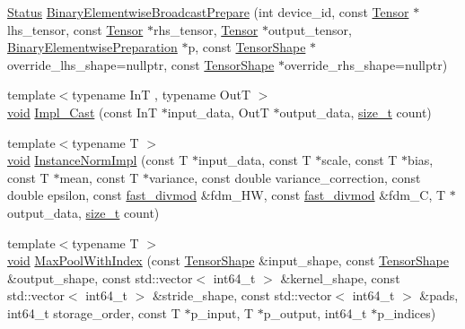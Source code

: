 \begin{DoxyCompactItemize}
\item 
\mbox{\hyperlink{classonnxruntime_1_1common_1_1Status}{Status}} \mbox{\hyperlink{namespaceonnxruntime_1_1cuda_abdb130419be4fca46b9b5a2f288e3f37}{Binary\+Elementwise\+Broadcast\+Prepare}} (int device\+\_\+id, const \mbox{\hyperlink{classonnxruntime_1_1Tensor}{Tensor}} $\ast$lhs\+\_\+tensor, const \mbox{\hyperlink{classonnxruntime_1_1Tensor}{Tensor}} $\ast$rhs\+\_\+tensor, \mbox{\hyperlink{classonnxruntime_1_1Tensor}{Tensor}} $\ast$output\+\_\+tensor, \mbox{\hyperlink{structonnxruntime_1_1cuda_1_1BinaryElementwisePreparation}{Binary\+Elementwise\+Preparation}} $\ast$p, const \mbox{\hyperlink{classonnxruntime_1_1TensorShape}{Tensor\+Shape}} $\ast$override\+\_\+lhs\+\_\+shape=nullptr, const \mbox{\hyperlink{classonnxruntime_1_1TensorShape}{Tensor\+Shape}} $\ast$override\+\_\+rhs\+\_\+shape=nullptr)
\item 
{\footnotesize template$<$typename InT , typename OutT $>$ }\\\mbox{\hyperlink{mlasi_8h_a88f941d423cb2a819b70a1358982b1a6}{void}} \mbox{\hyperlink{namespaceonnxruntime_1_1cuda_a5ec73c46b242d6ea59dd9965bc34e13f}{Impl\+\_\+\+Cast}} (const InT $\ast$input\+\_\+data, OutT $\ast$output\+\_\+data, \mbox{\hyperlink{mlasi_8h_a503efbc1c6e50825320ad909366b78ab}{size\+\_\+t}} count)
\item 
{\footnotesize template$<$typename T $>$ }\\\mbox{\hyperlink{mlasi_8h_a88f941d423cb2a819b70a1358982b1a6}{void}} \mbox{\hyperlink{namespaceonnxruntime_1_1cuda_af407fc77f1d77fc8f5a4a421d8545fbd}{Instance\+Norm\+Impl}} (const T $\ast$input\+\_\+data, const T $\ast$scale, const T $\ast$bias, const T $\ast$mean, const T $\ast$variance, const double variance\+\_\+correction, const double epsilon, const \mbox{\hyperlink{classonnxruntime_1_1cuda_1_1fast__divmod}{fast\+\_\+divmod}} \&fdm\+\_\+\+HW, const \mbox{\hyperlink{classonnxruntime_1_1cuda_1_1fast__divmod}{fast\+\_\+divmod}} \&fdm\+\_\+C, T $\ast$output\+\_\+data, \mbox{\hyperlink{mlasi_8h_a503efbc1c6e50825320ad909366b78ab}{size\+\_\+t}} count)
\item 
{\footnotesize template$<$typename T $>$ }\\\mbox{\hyperlink{mlasi_8h_a88f941d423cb2a819b70a1358982b1a6}{void}} \mbox{\hyperlink{namespaceonnxruntime_1_1cuda_af278cd2a5888f6ee33d879ce0d43fd6f}{Max\+Pool\+With\+Index}} (const \mbox{\hyperlink{classonnxruntime_1_1TensorShape}{Tensor\+Shape}} \&input\+\_\+shape, const \mbox{\hyperlink{classonnxruntime_1_1TensorShape}{Tensor\+Shape}} \&output\+\_\+shape, const std\+::vector$<$ int64\+\_\+t $>$ \&kernel\+\_\+shape, const std\+::vector$<$ int64\+\_\+t $>$ \&stride\+\_\+shape, const std\+::vector$<$ int64\+\_\+t $>$ \&pads, int64\+\_\+t storage\+\_\+order, const T $\ast$p\+\_\+input, T $\ast$p\+\_\+output, int64\+\_\+t $\ast$p\+\_\+indices)

\end{DoxyCompactItemize}
